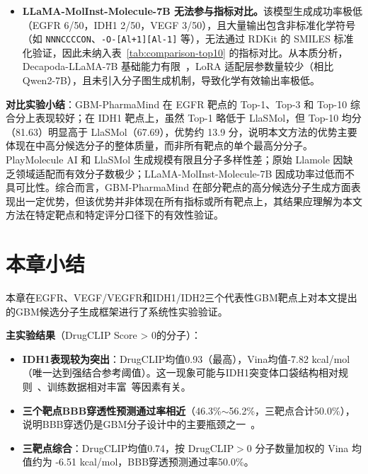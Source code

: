 \begin{itemize}
    \item \textbf{LLaMA-MolInst-Molecule-7B 无法参与指标对比。}该模型生成成功率极低（EGFR 6/50，IDH1 2/50，VEGF 3/50），且大量输出包含非标准化学符号（如 \texttt{NNNCCCCON}、\texttt{-O-[Al+1][Al-1]} 等），无法通过 RDKit 的 SMILES 标准化验证，因此未纳入表~\ref{tab:comparison-top10} 的指标对比。从本质分析，Decapoda-LLaMA-7B 基础能力有限~\cite{Touvron2023LLaMA}，LoRA 适配层参数量较少（相比 Qwen2-7B），且未引入分子图生成机制，导致化学有效输出率极低。

\end{itemize}

\textbf{对比实验小结}：GBM-PharmaMind 在 EGFR 靶点的 Top-1、Top-3 和 Top-10 综合分上表现较好；在 IDH1 靶点上，虽然 Top-1 略低于 LlaSMol，但 Top-10 均分（81.63）明显高于 LlaSMol（67.69），优势约 13.9 分，说明本文方法的优势主要体现在中高分候选分子的整体质量，而非所有靶点的单个最高分分子。PlayMolecule AI 和 LlaSMol 生成规模有限且分子多样性差；原始 Llamole 因缺乏领域适配而有效分子数极少；LLaMA-MolInst-Molecule-7B 因成功率过低而不具可比性。综合而言，GBM-PharmaMind 在部分靶点的高分候选分子生成方面表现出一定优势，但该优势并非体现在所有指标或所有靶点上，其结果应理解为本文方法在特定靶点和特定评分口径下的有效性验证。

\section{本章小结}\label{sec:ch4-summary}

本章在EGFR、VEGF/VEGFR和IDH1/IDH2三个代表性GBM靶点上对本文提出的GBM候选分子生成框架进行了系统性实验验证。

\textbf{主实验结果}（DrugCLIP Score > 0的分子）：
\begin{itemize}
    \item \textbf{IDH1表现较为突出}：DrugCLIP均值0.93（最高），Vina均值-7.82 kcal/mol（唯一达到强结合参考阈值）。这一现象可能与IDH1突变体口袋结构相对规则~\cite{Fu2025}、训练数据相对丰富~\cite{Gao2023}等因素有关。
    \item \textbf{三个靶点BBB穿透性预测通过率相近}（46.3\%$\sim$56.2\%，三靶点合计50.0\%），说明BBB穿透仍是GBM分子设计中的主要瓶颈之一~\cite{Pardridge2012}。
    \item \textbf{三靶点综合}：DrugCLIP均值0.74，按 DrugCLIP$>$0 分子数量加权的 Vina 均值约为 -6.51 kcal/mol，BBB穿透预测通过率50.0\%。
\end{itemize}

